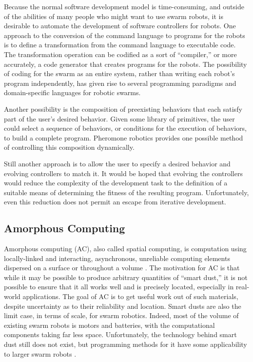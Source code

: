 Because the normal software development model is time-consuming, and outside of the abilities of many people who might want to use swarm robots, it is desirable to automate the development of software controllers for robots. 
One approach to the conversion of the command language to programs for the robots is to define a transformation from the command language to executable code. 
The transformation operation can be codified as a sort of ``compiler,'' or more accurately, a code generator that creates programs for the robots. 
The possibility of coding for the swarm as an entire system, rather than writing each robot's program independently, has given rise to several programming paradigms and domain-specific languages for robotic swarms. 

Another possibility is the composition of preexisting behaviors that each satisfy part of the user's desired behavior. 
Given some library of primitives, the user could select a sequence of behaviors, or conditions for the execution of behaviors, to build a complete program. 
Pheromone robotics provides one possible method of controlling this composition dynamically.
 
Still another approach is to allow the user to specify a desired behavior and evolving controllers to match it. 
It would be hoped that evolving the controllers would reduce the complexity of the development task to the definition of a suitable means of determining the fitness of the resulting program. 
Unfortunately, even this reduction does not permit an escape from iterative development. 

\subsection{Amorphous Computing} \label{section:Amorphous_Computing}

Amorphous computing (AC), also called spatial computing, is computation using locally-linked and interacting, asynchronous, unreliable computing elements dispersed on a surface or throughout a volume \citep{abelson2000amorphous}. 
The motivation for AC is that while it may be possible to produce arbitrary quantities of ``smart dust,'' it is not possible to ensure that it all works well and is precisely located, especially in real-world applications.
The goal of AC is to get useful work out of such materials, despite uncertainty as to their reliability and location. 
Smart dusts are also the limit case, in terms of scale, for swarm robotics. 
Indeed, most of the volume of existing swarm robots is motors and batteries, with the computational components taking far less space. 
Unfortunately, the technology behind smart dust still does not exist, but programming methods for it have some applicability to larger swarm robots \citep{Correll:2017:WRM:3131672.3131702}. 

